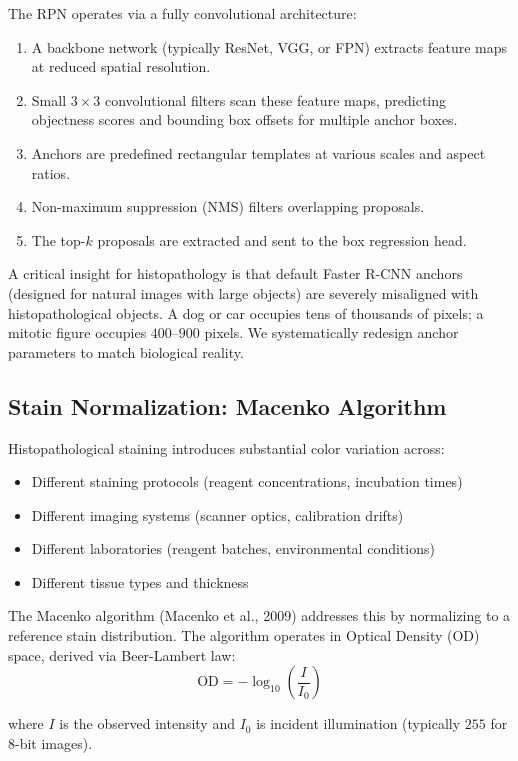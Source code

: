 \documentclass[journal]{IEEEtran}
\begin{document}
The RPN operates via a fully convolutional architecture:
\begin{enumerate}
\item A backbone network (typically ResNet, VGG, or FPN) extracts feature maps at reduced spatial resolution.
\item Small $3 \times 3$ convolutional filters scan these feature maps, predicting objectness scores and bounding box offsets for multiple anchor boxes.
\item Anchors are predefined rectangular templates at various scales and aspect ratios.
\item Non-maximum suppression (NMS) filters overlapping proposals.
\item The top-$k$ proposals are extracted and sent to the box regression head.
\end{enumerate}

A critical insight for histopathology is that default Faster R-CNN anchors (designed for natural images with large objects) are severely misaligned with histopathological objects. A dog or car occupies tens of thousands of pixels; a mitotic figure occupies $400$--$900$ pixels. We systematically redesign anchor parameters to match biological reality.

\subsection{Stain Normalization: Macenko Algorithm}
Histopathological staining introduces substantial color variation across:
\begin{itemize}
\item Different staining protocols (reagent concentrations, incubation times)
\item Different imaging systems (scanner optics, calibration drifts)
\item Different laboratories (reagent batches, environmental conditions)
\item Different tissue types and thickness
\end{itemize}

The Macenko algorithm (Macenko et al., 2009) addresses this by normalizing to a reference stain distribution. The algorithm operates in Optical Density (OD) space, derived via Beer-Lambert law:
\begin{equation}
\text{OD} = -\log_{10}\left(\frac{I}{I_0}\right)
\end{equation}

where $I$ is the observed intensity and $I_0$ is incident illumination (typically $255$ for 8-bit images).
\end{document}

